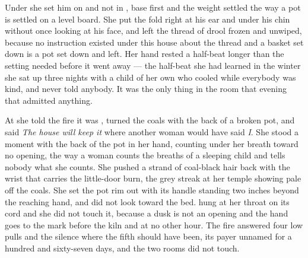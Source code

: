 Under  she set him on  and not in , base first and the weight settled the way a pot is settled on a level board. She put the fold right at his ear and under his chin without once looking at his face, and left the thread of drool frozen and unwiped, because no instruction existed under this house about the thread and a basket set down is a pot set down and left. Her hand rested a half-beat longer than the setting needed before it went away — the half-beat she had learned in the winter she sat up three nights with a child of her own who cooled while everybody was kind, and never told anybody. It was the only thing in the room that evening that admitted anything.

At  she told the fire it was , turned the coals with the back of a broken pot, and said \emph{The house will keep it} where another woman would have said \emph{I}. She stood a moment with the back of the pot in her hand, counting under her breath toward no opening, the way a woman counts the breaths of a sleeping child and tells nobody what she counts. She pushed a strand of coal-black hair back with the wrist that carries the little-door burn, the grey streak at her temple showing pale off the coals. She set the pot rim out with its handle standing two inches beyond the reaching hand, and did not look toward the bed.  hung at her throat on its cord and she did not touch it, because a dusk is not an opening and the hand goes to the mark before the kiln and at no other hour. The fire answered four low pulls and the silence where the fifth should have been, its payer unnamed for a hundred and sixty-seven days, and the two rooms did not touch.

